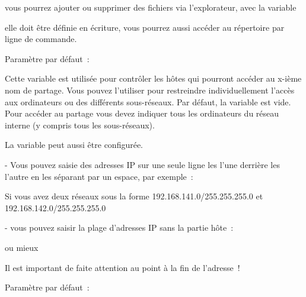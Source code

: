 \begin{description}

        vous pourrez ajouter ou supprimer des fichiers via l'explorateur,
        avec la variable


        elle doit être définie en écriture, vous pourrez aussi accéder au
        répertoire par ligne de commande.

        Paramètre par défaut~: 

\end{description}


\begin{description}

        Cette variable est utilisée pour contrôler les hôtes qui pourront accéder
        au x-ième nom de partage. Vous pouvez l'utiliser pour restreindre
        individuellement l'accès aux ordinateurs ou des différents sous-réseaux.
        Par défaut, la variable est vide. Pour accéder au partage vous devez
        indiquer tous les ordinateurs du réseau interne (y compris tous les
        sous-réseaux).

        La variable  peut aussi être configurée.

        - Vous pouvez saisie des adresses IP sur une seule ligne les l'une derrière
        les l'autre en les séparant par un espace, par exemple~:


        Si vous avez deux réseaux sous la forme 192.168.141.0/255.255.255.0 et
        192.168.142.0/255.255.255.0

        - vous pouvez saisir la plage d'adresses IP sans la partie hôte~:


          ou mieux


          Il est important de faite attention au point à la fin de l'adresse~!

        Paramètre par défaut~: 

\end{description}



